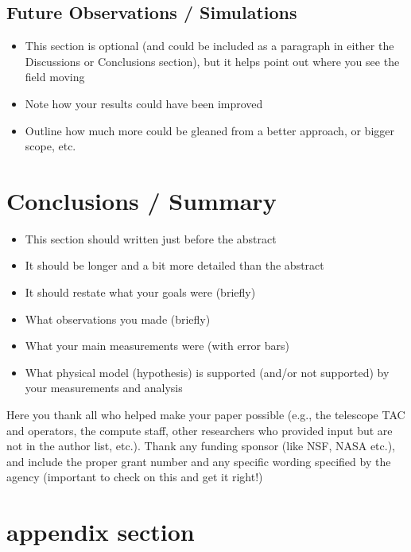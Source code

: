 \documentclass[twocolumn]{aastex61}
\begin{document}
\subsection{Future Observations / Simulations}
\begin{itemize}\itemsep0em
\item This section is optional (and could be included as a paragraph in either the Discussions or Conclusions section), but it helps point out where you see the field moving 
\item Note how your results could have been improved
\item Outline how much more could be gleaned from a better approach, or bigger scope, etc.
\end{itemize}


\section{Conclusions / Summary}
\begin{itemize}\itemsep0em
\item This section should written just before the abstract
\item It should be longer and a bit more detailed than the abstract
\item It should restate what your goals were (briefly)
\item What observations you made (briefly)
\item What your main measurements were (with error bars)
\item What physical model (hypothesis) is supported (and/or not supported) by your measurements and analysis
\end{itemize}

\acknowledgments
Here you thank all who helped make your paper possible (e.g., the telescope TAC and operators, the compute staff, other researchers who provided input but are not in the author list, etc.).  Thank any funding sponsor (like NSF, NASA etc.), and include the proper grant number and any specific wording specified by the agency (important to check on this and get it right!)





\appendix
\section{appendix section}
\end{document}
